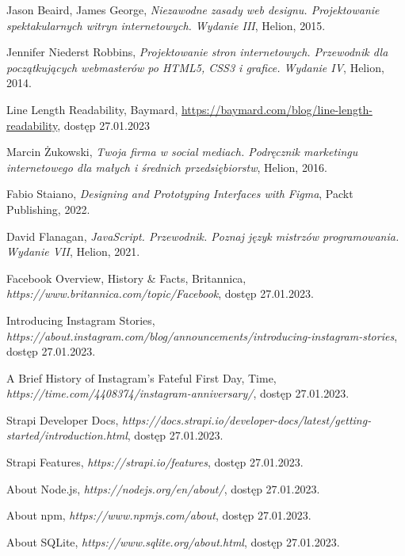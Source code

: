 \documentclass[a4paper, 12pt]{article}
\numberwithin{figure}{section}
\begin{document}
\begin{sloppypar}
\begin{thebibliography}{99}
    Jason Beaird, James George,
    \textit{Niezawodne zasady web designu. Projektowanie spektakularnych witryn internetowych. Wydanie III},
    Helion,
    2015.

    Jennifer Niederst Robbins,
    \textit{Projektowanie stron internetowych. Przewodnik dla początkujących webmasterów po HTML5, CSS3 i grafice. Wydanie IV},
    Helion,
    2014.

    Line Length Readability, Baymard,
    \url{https://baymard.com/blog/line-length-readability},
    dostęp 27.01.2023

    Marcin Żukowski,
    \textit{Twoja firma w social mediach. Podręcznik marketingu internetowego dla małych i średnich przedsiębiorstw},
    Helion,
    2016.

    Fabio Staiano,
    \textit{Designing and Prototyping Interfaces with Figma},
    Packt Publishing,
    2022.

    David Flanagan,
    \textit{JavaScript. Przewodnik. Poznaj język mistrzów programowania. Wydanie VII},
    Helion,
    2021.

    Facebook Overview, History \& Facts, Britannica,
    \textit{https://www.britannica.com/topic/Facebook},
    dostęp 27.01.2023.

    Introducing Instagram Stories,
    \textit{https://about.instagram.com/blog/announcements/introducing-instagram-stories},
    dostęp 27.01.2023.

    A Brief History of Instagram's Fateful First Day, Time,
    \textit{https://time.com/4408374/instagram-anniversary/},
    dostęp 27.01.2023.

    Strapi Developer Docs,
    \textit{https://docs.strapi.io/developer-docs/latest/getting-started/introduction.html},
    dostęp 27.01.2023.

    Strapi Features,
    \textit{https://strapi.io/features},
    dostęp 27.01.2023.

    About Node.js,
    \textit{https://nodejs.org/en/about/},
    dostęp 27.01.2023.

    About npm,
    \textit{https://www.npmjs.com/about},
    dostęp 27.01.2023.

    About SQLite,
    \textit{https://www.sqlite.org/about.html},
    dostęp 27.01.2023.


\end{thebibliography}
\end{sloppypar}
\end{document}
